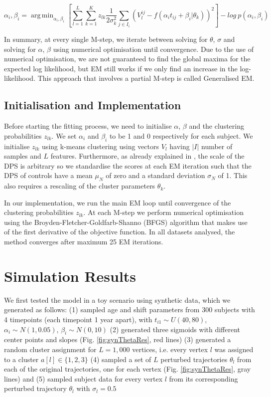 \documentclass{llncs}
\DeclareMathOperator*{\argmin}{arg\,min}
\begin{document}
\begin{equation}
\label{eq:alpha}
 \alpha_i, \beta_i = \argmin_{\alpha_i, \beta_i}  \left[ \sum_{l=1}^L \sum_{k=1}^K z_{lk} \frac{1}{2\sigma_k^2} \sum_{j \in I_i} (V_l^{ij} - f(\alpha_i t_{ij} + \beta_i | \theta_k))^2\right] - log\ p(\alpha_i, \beta_i)
\end{equation}

In summary, at every single M-step, we iterate between solving for $\theta$, $\sigma$ and solving for $\alpha$, $\beta$ using numerical optimisation until convergence. Due to the use of numerical optimisation, we are not guaranteed to find the global maxima for the expected log likelihood, but EM still works if we only find an increase in the log-likelihood. This approach that involves a partial M-step is called Generalised EM.

\subsection{Initialisation and Implementation}
\label{sec:initialisation}
Before starting the fitting process, we need to initialise $\alpha$, $\beta$ and the clustering probabilities $z_{lk}$. We set $\alpha_i$ and $\beta_i$ to be 1 and 0 respectively for each subject. We initialise $z_{lk}$ using k-means clustering using vectors $V_l$ having $|I|$ number of samples and $L$ features. Furthermore, as already explained in \cite{jedynak2012}, the scale of the DPS is arbitrary so we standardise the scores at each EM iteration such that the DPS of controls have a mean $\mu_N$ of zero and a standard deviation $\sigma_N$ of 1. This also requires a rescaling of the cluster parameters $\theta_k$.

In our implementation, we run the main EM loop until convergence of the clustering probabilities $z_{lk}$. At each M-step we perform numerical optimisation using the Broyden-Fletcher-Goldfarb-Shanno (BFGS) algorithm that makes use of the first derivative of the objective function. In all datasets analysed, the method converges after maximum 25 EM iterations. 

\section{Simulation Results}

We first tested the model in a toy scenario using synthetic data, which we generated as follows: (1) sampled age and shift parameters from 300 subjects with 4 timepoints (each timepoint 1 year apart), with $t_{i1} \sim U(40,80)$, $\alpha_i \sim N(1, 0.05)$, $\beta_i \sim N(0, 10)$ (2) generated three sigmoids with different center points and slopes (Fig. \ref{fig:synThetaRes}, red lines) (3) generated a random cluster assignment for $L = 1,000$ vertices, i.e. every vertex $l$ was assigned to a cluster $a[l] \in \{1,2,3\}$ (4) sampled a set of $L$ perturbed trajectories $\theta_l$ from each of the original trajectories, one for each vertex (Fig. \ref{fig:synThetaRes}, gray lines) and (5) sampled subject data for every vertex $l$ from its corresponding perturbed trajectory $\theta_l$ with $\sigma_l = 0.5$
\end{document}
